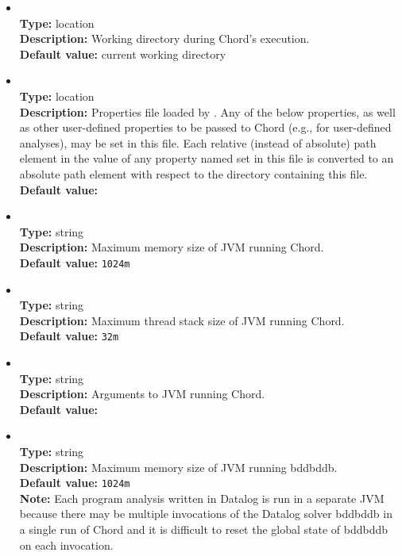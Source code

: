 \begin{itemize}
\item
{} \\
{\bf Type:} location \\
{\bf Description:} Working directory during Chord's execution. \\
{\bf Default value:} current working directory

\item
{} \\
{\bf Type:} location \\
{\bf Description:} Properties file loaded by .  Any of the below properties, as well as other user-defined properties to be passed to Chord (e.g., for user-defined analyses), may be set in this file.  Each relative (instead of absolute) path element in the value of any property named  set in this file is converted to an absolute path element with respect to the directory containing this file. \\
{\bf Default value:}  

\item
{} \\
{\bf Type:} string \\
{\bf Description:} Maximum memory size of JVM running Chord. \\
{\bf Default value:} {\tt 1024m} 

\item 
{} \\
{\bf Type:} string \\
{\bf Description:} Maximum thread stack size of JVM running Chord. \\
{\bf Default value:} {\tt 32m} 

\item
{} \\
{\bf Type:} string \\
{\bf Description:} Arguments to JVM running Chord. \\
{\bf Default value:}    

\item
{} \\
{\bf Type:} string \\
{\bf Description:} Maximum memory size of JVM running bddbddb. \\
{\bf Default value:} {\tt 1024m} \\
{\bf Note:} Each program analysis written in Datalog is run in a separate JVM because there may be multiple invocations of the Datalog solver bddbddb in a single run of Chord and it is difficult to reset the global state of bddbddb on each invocation.
\end{itemize}

